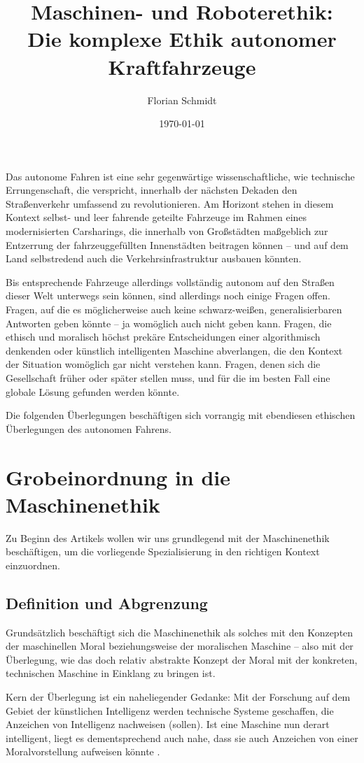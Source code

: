 \documentclass[twocolumn, german]{tum-article}
\title{{\color{TUMBlau} Maschinen- und Roboterethik:}\\Die komplexe Ethik autonomer Kraftfahrzeuge}
\author{Florian Schmidt\authormark{1, \,\Letter}}
\affil[1]{Fakultät für Informatik, Technische Universität München (TUM),
  Boltzmannstr. 3, 85748 Garching, Germany}
\date{\today}
\begin{document}
\maketitle

Das autonome Fahren ist eine sehr gegenwärtige wissenschaftliche, wie technische Errungenschaft, die verspricht, innerhalb der nächsten Dekaden den Straßenverkehr umfassend zu revolutionieren. Am Horizont stehen in diesem Kontext selbst- und leer fahrende geteilte Fahrzeuge im Rahmen eines modernisierten Carsharings, die innerhalb von Großstädten maßgeblich zur Entzerrung der fahrzeuggefüllten Innenstädten beitragen können -- und auf dem Land selbstredend auch die Verkehrsinfrastruktur ausbauen könnten.

Bis entsprechende Fahrzeuge allerdings vollständig autonom auf den Straßen dieser Welt unterwegs sein können, sind allerdings noch einige Fragen offen. Fragen, auf die es möglicherweise auch keine schwarz-weißen, generalisierbaren Antworten geben könnte -- ja womöglich auch nicht geben kann. Fragen, die ethisch und moralisch höchst prekäre Entscheidungen einer algorithmisch denkenden oder künstlich intelligenten Maschine abverlangen, die den Kontext der Situation womöglich gar nicht verstehen kann. Fragen, denen sich die Gesellschaft früher oder später stellen muss, und für die im besten Fall eine globale Lösung gefunden werden könnte.

Die folgenden Überlegungen beschäftigen sich vorrangig mit ebendiesen ethischen Überlegungen des autonomen Fahrens.


\section{Grobeinordnung in die Maschinenethik}
Zu Beginn des Artikels wollen wir uns grundlegend mit der Maschinenethik beschäftigen, um die vorliegende Spezialisierung in den richtigen Kontext einzuordnen.


\subsection{Definition und Abgrenzung}
Grundsätzlich beschäftigt sich die Maschinenethik als solches mit den Konzepten der maschinellen Moral beziehungsweise der moralischen Maschine -- also mit der Überlegung, wie das doch relativ abstrakte Konzept der Moral mit der konkreten, technischen Maschine in Einklang zu bringen ist.

Kern der Überlegung ist ein naheliegender Gedanke: Mit der Forschung auf dem Gebiet der künstlichen Intelligenz werden technische Systeme geschaffen, die Anzeichen von Intelligenz nachweisen (sollen). Ist eine Maschine nun derart intelligent, liegt es dementsprechend auch nahe, dass sie auch Anzeichen von einer Moralvorstellung aufweisen könnte \cite[S. 3f.]{bendel-mascheth}.
\end{document}
